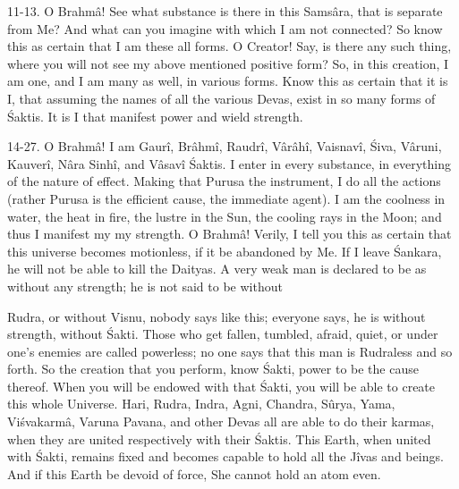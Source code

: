11-13. O Brahm\^a! See what substance is there in this Sams\^ara, that is separate from Me? And what can you imagine with which I am not connected? So know this as certain that I am these all forms. O Creator! Say, is there any such thing, where you will not see my above mentioned positive form? So, in this creation, I am one, and I am many as well, in various forms. Know this as certain that it is I, that assuming the names of all the various Devas, exist in so many forms of \'Saktis. It is I that manifest power and wield strength.

14-27. O Brahm\^a! I am Gaur\^i, Br\^ahm\^i, Raudr\^i, V\^ar\^ah\^i, Vaisnav\^i, \'Siva, V\^aruni, Kauver\^i, N\^ara Sinh\^i, and V\^asav\^i \'Saktis. I enter in every substance, in everything of the nature of effect. Making that Purusa the instrument, I do all the actions (rather Purusa is the efficient cause, the immediate agent). I am the coolness in water, the heat in fire, the lustre in the Sun, the cooling rays in the Moon; and thus I manifest my my strength. O Brahm\^a! Verily, I tell you this as certain that this universe becomes motionless, if it be abandoned by Me. If I leave \'Sankara, he will not be able to kill the Daityas. A very weak man is declared to be as without any strength; he is not said to be without

Rudra, or without Visnu, nobody says like this; everyone says, he is without strength, without \'Sakti. Those who get fallen, tumbled, afraid, quiet, or under one's enemies are called powerless; no one says that this man is Rudraless and so forth. So the creation that you perform, know \'Sakti, power to be the cause thereof. When you will be endowed with that \'Sakti, you will be able to create this whole Universe. Hari, Rudra, Indra, Agni, Chandra, Sûrya, Yama, Vi\'svakarm\^a, Varuna Pavana, and other Devas all are able to do their karmas, when they are united respectively with their \'Saktis. This Earth, when united with \'Sakti, remains fixed and becomes capable to hold all the J\^ivas and beings. And if this Earth be devoid of force, She cannot hold an atom even.

